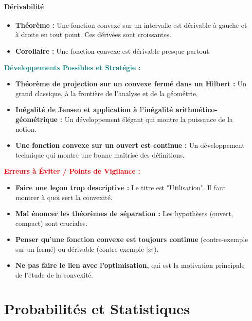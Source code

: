 \documentclass[12pt, a4paper, parskip=full]{report}
\theoremstyle{agregstyle}
\newenvironment{developpements}
  {\par\medskip\noindent\begin{oframed}\noindent\textbf{\textcolor{teal}{Développements Possibles et Stratégie :}}}
  {\end{oframed}\par\medskip}
\newenvironment{erreurs}
  {\par\medskip\noindent\begin{oframed}\noindent\textbf{\textcolor{red}{Erreurs à Éviter / Points de Vigilance :}}}
  {\end{oframed}\par\medskip}
\begin{document}
\subsection{Dérivabilité}
\begin{itemize}
    \item \textbf{Théorème :} Une fonction convexe sur un intervalle est dérivable à gauche et à droite en tout point. Ces dérivées sont croissantes.
    \item \textbf{Corollaire :} Une fonction convexe est dérivable presque partout.
\end{itemize}

\begin{developpements}
    \begin{itemize}
        \item \textbf{Théorème de projection sur un convexe fermé dans un Hilbert :} Un grand classique, à la frontière de l'analyse et de la géométrie.
        \item \textbf{Inégalité de Jensen et application à l'inégalité arithmético-géométrique :} Un développement élégant qui montre la puissance de la notion.
        \item \textbf{Une fonction convexe sur un ouvert est continue :} Un développement technique qui montre une bonne maîtrise des définitions.
    \end{itemize}
\end{developpements}

\begin{erreurs}
    \begin{itemize}
        \item \textbf{Faire une leçon trop descriptive :} Le titre est "Utilisation". Il faut montrer à quoi sert la convexité.
        \item \textbf{Mal énoncer les théorèmes de séparation :} Les hypothèses (ouvert, compact) sont cruciales.
        \item \textbf{Penser qu'une fonction convexe est toujours continue} (contre-exemple sur un fermé) ou dérivable (contre-exemple $|x|$).
        \item \textbf{Ne pas faire le lien avec l'optimisation,} qui est la motivation principale de l'étude de la convexité.
    \end{itemize}
\end{erreurs}

\part{Probabilités et Statistiques}
\end{document}
